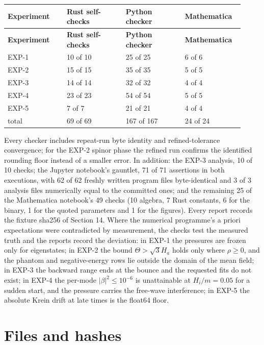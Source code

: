 \documentclass[11pt]{article}
\begin{document}
\begin{longtable}{@{}p{0.230\linewidth}p{0.230\linewidth}p{0.230\linewidth}p{0.230\linewidth}@{}}
\toprule
\textbf{Experiment} & \textbf{Rust self-checks} & \textbf{Python checker} & \textbf{Mathematica} \\
\midrule
\endfirsthead
\toprule
\textbf{Experiment} & \textbf{Rust self-checks} & \textbf{Python checker} & \textbf{Mathematica} \\
\midrule
\endhead
EXP-1 & 10 of 10 & 25 of 25 & 6 of 6 \\
EXP-2 & 15 of 15 & 35 of 35 & 5 of 5 \\
EXP-3 & 14 of 14 & 32 of 32 & 4 of 4 \\
EXP-4 & 23 of 23 & 54 of 54 & 5 of 5 \\
EXP-5 & 7 of 7 & 21 of 21 & 4 of 4 \\
total & 69 of 69 & 167 of 167 & 24 of 24 \\
\bottomrule
\end{longtable}

Every checker includes repeat-run byte identity and refined-tolerance convergence; for the EXP-2 spinor phase the refined run confirms the identified rounding floor instead of a smaller error. In addition: the EXP-3 analysis, 10 of 10 checks; the Jupyter notebook's gauntlet, 71 of 71 assertions in both executions, with 62 of 62 freshly written program files byte-identical and 3 of 3 analysis files numerically equal to the committed ones; and the remaining 25 of the Mathematica notebook's 49 checks (10 algebra, 7 Rust constants, 6 for the binary, 1 for the quoted parameters and 1 for the figures). Every report records the fixture sha256 of Section 14. Where the numerical programme's a priori expectations were contradicted by measurement, the checks test the measured truth and the reports record the deviation: in EXP-1 the pressures are frozen only for eigenstates; in EXP-2 the bound $\Theta>\sqrt3H_a$ holds only where $\rho\ge0$, and the phantom and negative-energy rows lie outside the domain of the mean field; in EXP-3 the backward range ends at the bounce and the requested fits do not exist; in EXP-4 the per-mode $|\beta|^2\le10^{-6}$ is unattainable at $H_i/m=0.05$ for a sudden start, and the pressure carries the free-wave interference; in EXP-5 the absolute Krein drift at late times is the float64 floor.

\section{Files and hashes}
\end{document}
